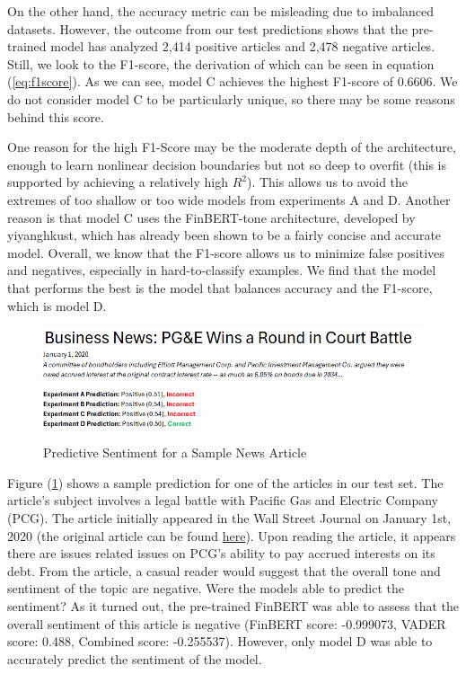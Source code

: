 \documentclass[12pt]{article}
\begin{document}
On the other hand, the accuracy metric can be misleading due to imbalanced datasets. However, the outcome from our test predictions shows that the pre-trained model has analyzed 2,414 positive articles and 2,478 negative articles. Still, we look to the F1-score, the derivation of which can be seen in equation (\ref{eq:f1score}). As we can see, model C achieves the highest F1-score of 0.6606. We do not consider model C to be particularly unique, so there may be some reasons behind this score.

One reason for the high F1-Score may be the moderate depth of the architecture, enough to learn nonlinear decision boundaries but not so deep to overfit (this is supported by achieving a relatively high $R^2$). This allows us to avoid the extremes of too shallow or too wide models from experiments A and D. Another reason is that model C uses the FinBERT-tone architecture, developed by yiyanghkust, which has already been shown to be a fairly concise and accurate model. Overall, we know that the F1-score allows us to minimize false positives and negatives, especially in hard-to-classify examples. We find that the model that performs the best is the model that balances accuracy and the F1-score, which is model D.

\begin{figure}[h]
	\centering
	\includegraphics[width=1\linewidth]{plots/outcome.png}
	\caption{Predictive Sentiment for a Sample News Article}
	\label{fig:outcome}
\end{figure}

Figure (\ref{fig:outcome}) shows a sample prediction for one of the articles in our test set. The article's subject involves a legal battle with Pacific Gas and Electric Company (PCG). The article initially appeared in the Wall Street Journal on January 1st, 2020 (the original article can be found \href{https://www.wsj.com/articles/pg-e-bankruptcy-court-rules-against-bondholders-in-interest-rate-fight-11577829961}{here}). Upon reading the article, it appears there are issues related issues on PCG's ability to pay accrued interests on its debt. From the article, a casual reader would suggest that the overall tone and sentiment of the topic are negative. Were the models able to predict the sentiment? As it turned out, the pre-trained FinBERT was able to assess that the overall sentiment of this article is negative (FinBERT score: -0.999073, VADER score: 0.488, Combined score: -0.255537). However, only model D was able to accurately predict the sentiment of the model.
\end{document}
